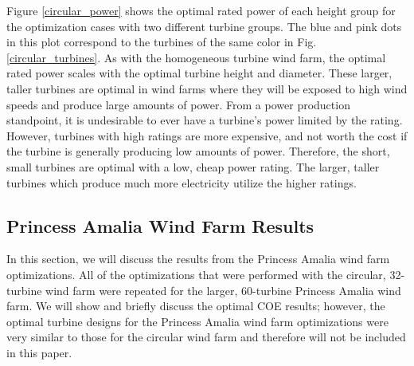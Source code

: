 \documentclass[WESD, manuscript]{copernicus}
\begin{document}
Figure \ref{circular_power} shows the optimal rated power of each height group for the optimization cases with two different turbine groups. The blue and pink dots in this plot correspond to the turbines of the same color in Fig. \ref{circular_turbines}. As with the homogeneous turbine wind farm, the optimal rated power scales with the optimal turbine height and diameter. These larger, taller turbines are optimal in wind farms where they will be exposed to high wind speeds and produce large amounts of power. From a power production standpoint, it is undesirable to ever have a turbine's power limited by the rating. However, turbines with high ratings are more expensive, and not worth the cost if the turbine is generally producing low amounts of power. Therefore, the short, small turbines are optimal with a low, cheap power rating. The larger, taller turbines which produce much more electricity utilize the higher ratings.





\subsection{Princess Amalia Wind Farm Results}

In this section, we will discuss the results from the Princess Amalia wind farm optimizations.
All of the optimizations that were performed with the circular, 32-turbine wind farm were repeated for the larger, 60-turbine Princess Amalia wind farm. We will show and briefly discuss the optimal COE results; however, the optimal turbine designs for the Princess Amalia wind farm optimizations were very similar to those for the circular wind farm and therefore will not be included in this paper.
\end{document}
